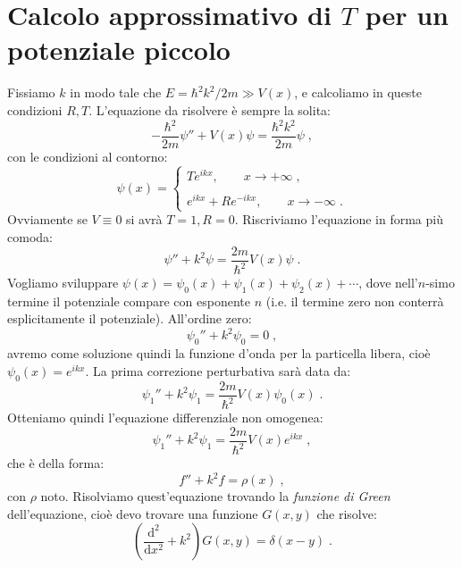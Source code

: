 \documentclass[12pt,a4paper]{report}
\theoremstyle{definition}
\numberwithin{equation}{section}
\newcommand{\diff}[1][]{\mathrm{d}#1}
\begin{document}
\section{Calcolo approssimativo di $T$ per un potenziale piccolo}
Fissiamo $k$ in modo tale che $E=\hbar^2k^2/2m\gg V(x)$, e calcoliamo in queste condizioni $R,T$. L'equazione da risolvere è sempre la solita:
\begin{equation}
-\frac{\hbar^2}{2m}\psi''+V(x)\psi=\frac{\hbar^2k^2}{2m}\psi\;,
\end{equation}
con le condizioni al contorno:
\begin{equation}
\psi(x)=\begin{cases}
Te^{ikx}, \qquad x\to+\infty\;, \\
\\
e^{ikx}+Re^{-ikx}, \qquad x\to-\infty\;.
\end{cases}
\end{equation}
Ovviamente se $V\equiv 0$ si avrà $T=1,R=0$. Riscriviamo l'equazione in forma più comoda:
\begin{equation}
\psi''+k^2\psi=\frac{2m}{\hbar^2}V(x)\psi\;.
\end{equation}
Vogliamo sviluppare $\psi(x)=\psi_0(x)+\psi_1(x)+\psi_2(x)+\cdots$, dove nell'$n$-simo termine il potenziale compare con esponente $n$ (i.e. il termine zero non conterrà esplicitamente il potenziale). All'ordine zero:
\begin{equation}
\psi_0''+k^2\psi_0=0\;,
\end{equation}
avremo come soluzione quindi la funzione d'onda per la particella libera, cioè $\psi_0(x)=e^{ikx}$. La prima correzione perturbativa sarà data da:
\begin{equation*}
\psi_1''+k^2\psi_1=\frac{2m}{\hbar^2}V(x)\psi_0(x)\;.
\end{equation*}
Otteniamo quindi l'equazione differenziale non omogenea:
\begin{equation}
\psi_1''+k^2\psi_1=\frac{2m}{\hbar^2}V(x)e^{ikx}\;,
\end{equation}
che è della forma:
\begin{equation}
f''+k^2f=\rho(x)\;, \label{ch5_firstorder}
\end{equation}
con $\rho$ noto. Risolviamo quest'equazione trovando la \textit{funzione di Green} dell'equazione, cioè devo trovare una funzione $G(x,y)$ che risolve:
\begin{equation}
\left(\frac{\diff^2}{\diff{x}^2}+k^2\right)G(x,y)=\delta(x-y)\;. \label{ch5_greenfunction}
\end{equation}
\end{document}
